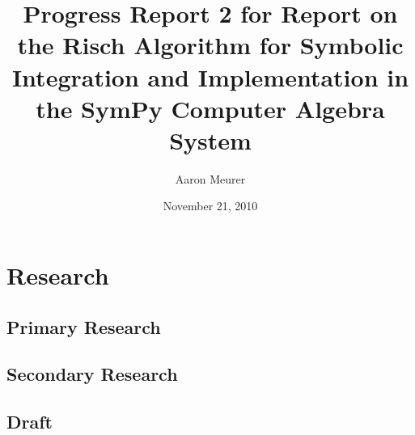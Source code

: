 \documentclass[12pt]{article}
\begin{document}
\title{Progress Report 2 for Report on the Risch Algorithm for Symbolic
Integration and Implementation in the Sym\-Py Computer Algebra System}
\author{Aaron Meurer}
\date{November 21, 2010}
\maketitle


\section{Research}
\subsection{Primary Research}

\subsection{Secondary Research}

\subsection{Draft}
\end{document}
